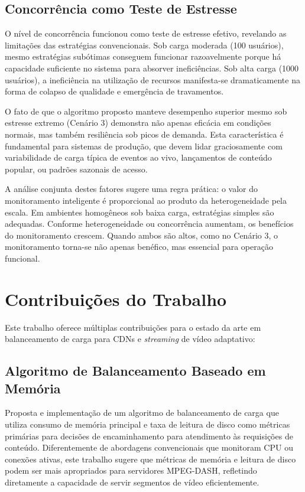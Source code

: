 \subsection{Concorrência como Teste de Estresse}

O nível de concorrência funcionou como teste de estresse efetivo, revelando as limitações das estratégias convencionais. Sob carga moderada (100 usuários), mesmo estratégias subótimas conseguem funcionar razoavelmente porque há capacidade suficiente no sistema para absorver ineficiências. Sob alta carga (1000 usuários), a ineficiência na utilização de recursos manifesta-se dramaticamente na forma de colapso de qualidade e emergência de travamentos.

O fato de que o algoritmo proposto manteve desempenho superior mesmo sob estresse extremo (Cenário 3) demonstra não apenas eficácia em condições normais, mas também resiliência sob picos de demanda. Esta característica é fundamental para sistemas de produção, que devem lidar graciosamente com variabilidade de carga típica de eventos ao vivo, lançamentos de conteúdo popular, ou padrões sazonais de acesso.

A análise conjunta destes fatores sugere uma regra prática: o valor do monitoramento inteligente é proporcional ao produto da heterogeneidade pela escala. Em ambientes homogêneos sob baixa carga, estratégias simples são adequadas. Conforme heterogeneidade ou concorrência aumentam, os benefícios do monitoramento crescem. Quando ambos são altos, como no Cenário 3, o monitoramento torna-se não apenas benéfico, mas essencial para operação funcional.

\section{Contribuições do Trabalho}

Este trabalho oferece múltiplas contribuições para o estado da arte em balanceamento de carga para CDNs e \textit{streaming} de vídeo adaptativo:

\subsection{Algoritmo de Balanceamento Baseado em Memória}

Proposta e implementação de um algoritmo de balanceamento de carga que utiliza consumo de memória principal e taxa de leitura de disco como métricas primárias para decisões de encaminhamento para atendimento às requisições de conteúdo. Diferentemente de abordagens convencionais que monitoram CPU ou conexões ativas, este trabalho sugere que métricas de memória e leitura de disco podem ser mais apropriados para servidores MPEG-DASH, refletindo diretamente a capacidade de servir segmentos de vídeo eficientemente.

